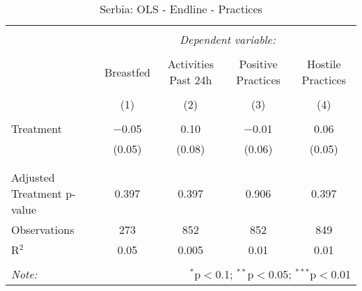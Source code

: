 
\begin{table}[!htbp] \centering 
  \caption{Serbia: OLS - Endline - Practices} 
  \label{tbl:Serbia: OLS - Endline - Practices} 
\begin{tabular}{@{\extracolsep{5pt}}lcccc} 
\\[-1.8ex]\hline 
\hline \\[-1.8ex] 
 & \multicolumn{4}{c}{\textit{Dependent variable:}} \\ 
\cline{2-5} 
\\[-1.8ex] & Breastfed & Activities Past 24h & Positive Practices & Hostile Practices \\ 
\\[-1.8ex] & (1) & (2) & (3) & (4)\\ 
\hline \\[-1.8ex] 
 Treatment & $-$0.05 & 0.10 & $-$0.01 & 0.06 \\ 
  & (0.05) & (0.08) & (0.06) & (0.05) \\ 
  & & & & \\ 
\hline \\[-1.8ex] 
Adjusted Treatment p-value & 0.397 & 0.397 & 0.906 & 0.397 \\ 
Observations & 273 & 852 & 852 & 849 \\ 
R$^{2}$ & 0.05 & 0.005 & 0.01 & 0.01 \\ 
\hline 
\hline \\[-1.8ex] 
\textit{Note:}  & \multicolumn{4}{r}{$^{*}$p$<$0.1; $^{**}$p$<$0.05; $^{***}$p$<$0.01} \\ 
\end{tabular} 
\end{table} 
